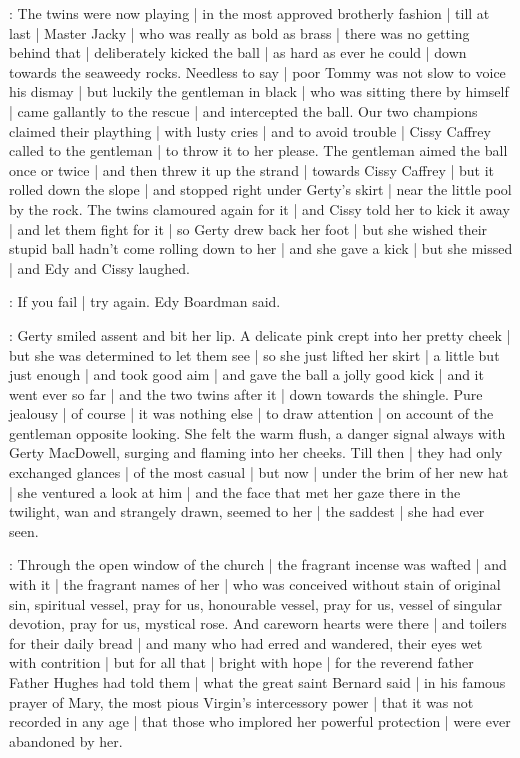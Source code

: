 :
The twins were now playing |
in the most approved brotherly fashion |
till at last |
Master Jacky |
who was really as bold as brass |
there was no getting behind that |
deliberately kicked the ball |
as hard as ever he could |
down towards the seaweedy rocks.
Needless to say |
poor Tommy was not slow to voice his dismay |
but luckily the gentleman in black |
who was sitting there by himself |
came gallantly to the rescue |
and intercepted the ball.%
Our two champions
claimed their plaything |
with lusty cries |
and to avoid trouble |
Cissy Caffrey called to the gentleman |
to throw it to her please.
The gentleman aimed the ball
once or twice |
and then threw it up the strand |
towards Cissy Caffrey |
but it rolled down the slope |
and stopped right under Gerty's skirt |
near the little pool by the rock.
The twins clamoured again for it |
and Cissy told her to kick it away |
and let them fight for it |
so Gerty drew back her foot |
but she wished
their stupid ball hadn't come rolling down to her |
and she gave a kick |
but she missed |
and Edy and Cissy laughed.

\edy:
If you fail |
try again.
Edy Boardman said.

:
Gerty smiled assent and bit her lip.%
A delicate pink
crept into her pretty cheek |
but she was determined to let them see |
so she just lifted her skirt |
a little but just enough |
and took good aim |
and gave the ball a jolly good kick |
and it went ever so far |
and the two twins after it |
down towards the shingle.
Pure jealousy |
of course |
it was nothing else |
to draw attention |
on account of the gentleman opposite looking.
She felt the warm flush,
a danger signal always with Gerty MacDowell,
surging and flaming into her cheeks.
Till then |
they had only exchanged glances |
of the most casual |
but now |
under the brim of her new hat |
she ventured a look at him |
and the face that met her gaze there in the twilight,
wan and strangely drawn,
seemed to her |%
the saddest |
she had ever seen.

:
Through the open window of the church |
the fragrant incense was wafted |
and with it |
the fragrant names of her |
who was conceived without stain of original sin,
spiritual vessel,
pray for us,
honourable vessel,
pray for us,
vessel of singular devotion,
pray for us,
mystical rose.
And careworn hearts were there |
and toilers for their daily bread |
and many who had erred and wandered,
their eyes wet with contrition |
but for all that |
bright with hope |
for the reverend father Father Hughes
had told them |
what the great saint Bernard said |
in his famous prayer of Mary,
the most pious Virgin's intercessory power |
that it was not recorded in any age |
that those who implored her powerful protection |%
were ever abandoned by her.

